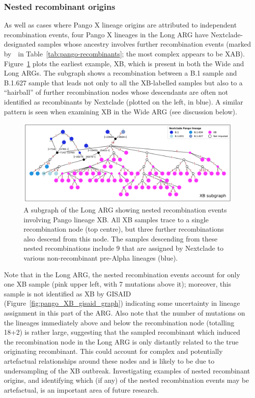\documentclass{article}
\begin{document}
\subsubsection{Nested recombinant origins}
As well as cases where Pango X lineage origins are attributed to independent
recombination events, four Pango X lineages in the Long ARG have Nextclade-designated
samples whose ancestry involves further recombination events
(marked by~\textdagger ~in Table~\ref{tab:pango-recombinants}; the most
complex appears to be XAB). Figure~\ref{fig:complex_origins_graph} plots the earliest example,
XB,  which is present in both the Wide and Long ARGs. The subgraph shows a recombination
between a B.1 sample and B.1.627 sample that leads not only to all the XB-labelled samples
but also to a ``hairball'' of further recombination nodes whose descendants are often not
identified as recombinants by Nextclade (plotted on the left, in blue). A similar
pattern is seen when examining XB in the Wide ARG (see discussion below).

\begin{figure} \centering
\includegraphics[width=\textwidth]{figures/Pango_XB_nxcld_tight_graph.pdf}
\caption{\label{fig:complex_origins_graph}  A subgraph of the Long ARG showing
nested recombination events involving Pango lineage XB. All XB samples
trace to a single recombination node (top centre), but three further recombinations
also descend from this node. The samples descending from these nested
recombinations include 9 that are assigned by Nextclade to
various non-recombinant pre-Alpha lineages (blue).}
\end{figure}

Note that in the Long ARG, the nested recombination events account for only one
XB sample (pink upper left, with 7 mutations above it); moreover, this sample is
not identified as XB by GISAID (Figure~\ref{fig:pango_XB_gisaid_graph})
indicating some uncertainty in lineage assignment in this part of the ARG.
Also note that the number of mutations on the lineages immediately above and
below the recombination node (totalling 18+2) is rather large, suggesting
that the sampled recombinant which induced the recombination node in the Long ARG
is only distantly related to the true originating recombinant. This could account
for complex and potentially artefactual relationships around these nodes and
is likely to be due to undersampling of the XB outbreak. Investigating examples
of nested recombinant origins, and identifying which (if any) of the nested
recombination events may be artefactual, is an important area of future research.
\end{document}
